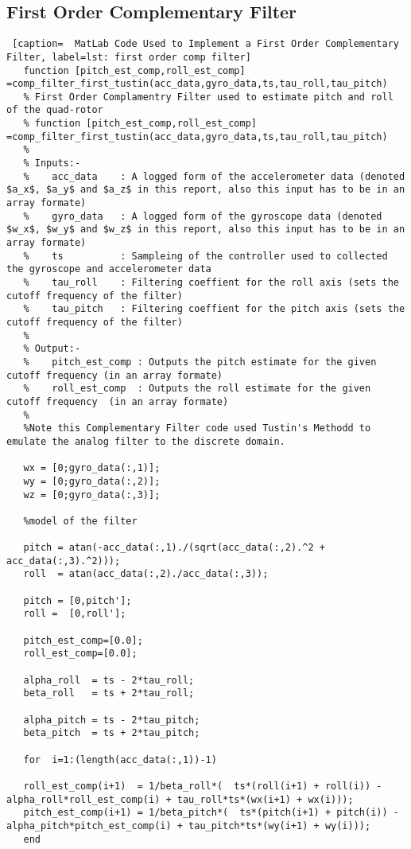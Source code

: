    \subsection{First Order Complementary Filter} \label{sec: first order complmentary filter code}
    \begin{lstlisting} [caption=  MatLab Code Used to Implement a First Order Complementary Filter, label=lst: first order comp filter]
   function [pitch_est_comp,roll_est_comp] =comp_filter_first_tustin(acc_data,gyro_data,ts,tau_roll,tau_pitch) 
   % First Order Complamentry Filter used to estimate pitch and roll of the quad-rotor
   % function [pitch_est_comp,roll_est_comp] =comp_filter_first_tustin(acc_data,gyro_data,ts,tau_roll,tau_pitch) 
   %
   % Inputs:-
   %	acc_data    : A logged form of the accelerometer data (denoted $a_x$, $a_y$ and $a_z$ in this report, also this input has to be in an array formate)
   % 	gyro_data   : A logged form of the gyroscope data (denoted $w_x$, $w_y$ and $w_z$ in this report, also this input has to be in an array formate)
   %	ts          : Sampleing of the controller used to collected the gyroscope and accelerometer data
   %	tau_roll    : Filtering coeffient for the roll axis (sets the cutoff frequency of the filter)
   %	tau_pitch   : Filtering coeffient for the pitch axis (sets the cutoff frequency of the filter)
   %
   % Output:-  
   % 	pitch_est_comp : Outputs the pitch estimate for the given cutoff frequency (in an array formate)
   % 	roll_est_comp  : Outputs the roll estimate for the given cutoff frequency  (in an array formate)
   %
   %Note this Complementary Filter code used Tustin's Methodd to emulate the analog filter to the discrete domain.
   
   wx = [0;gyro_data(:,1)];
   wy = [0;gyro_data(:,2)];
   wz = [0;gyro_data(:,3)];
   
   %model of the filter
   
   pitch = atan(-acc_data(:,1)./(sqrt(acc_data(:,2).^2 + acc_data(:,3).^2))); 
   roll  = atan(acc_data(:,2)./acc_data(:,3));    
   
   pitch = [0,pitch'];
   roll =  [0,roll'];
   
   pitch_est_comp=[0.0];
   roll_est_comp=[0.0];
   
   alpha_roll  = ts - 2*tau_roll;
   beta_roll   = ts + 2*tau_roll;
   
   alpha_pitch = ts - 2*tau_pitch;
   beta_pitch  = ts + 2*tau_pitch;
   
   for  i=1:(length(acc_data(:,1))-1)
   
   roll_est_comp(i+1)  = 1/beta_roll*(  ts*(roll(i+1) + roll(i)) -alpha_roll*roll_est_comp(i) + tau_roll*ts*(wx(i+1) + wx(i)));
   pitch_est_comp(i+1) = 1/beta_pitch*(  ts*(pitch(i+1) + pitch(i)) -alpha_pitch*pitch_est_comp(i) + tau_pitch*ts*(wy(i+1) + wy(i)));
   end
   \end{lstlisting}
   
